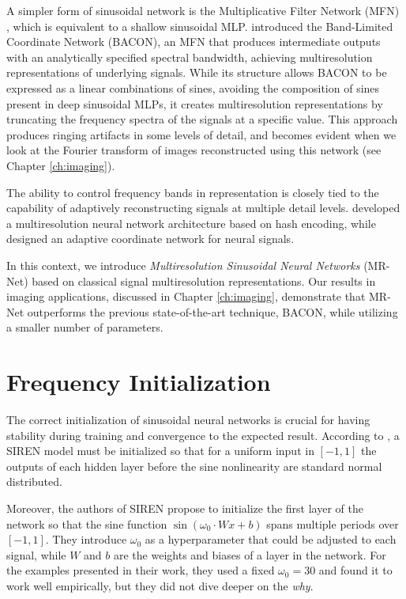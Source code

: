 A simpler form of sinusoidal network is the Multiplicative Filter Network (MFN) \cite{fathony2020multiplicative}, which is equivalent to a shallow sinusoidal MLP. \cite{bacon2021} introduced the Band-Limited Coordinate Network (BACON), an MFN that produces intermediate outputs with an analytically specified spectral bandwidth, achieving multiresolution representations of underlying signals. While its structure allows BACON to be expressed as a linear combinations of sines, avoiding the composition of sines present in deep sinusoidal MLPs, it creates multiresolution representations by truncating the frequency spectra of the signals at a specific value. This approach produces ringing artifacts in some levels of detail, and becomes evident when we look at the Fourier transform of images reconstructed using this network (see Chapter \ref{ch:imaging}).

The ability to control frequency bands in representation is closely tied to the capability of adaptively reconstructing signals at multiple detail levels. \citet{mueller2022instant} developed a multiresolution neural network architecture based on hash encoding, while \citet{martel2021acorn} designed an adaptive coordinate network for neural signals.

In this context, we introduce \textit{Multiresolution Sinusoidal Neural Networks} (MR-Net) \cite{paz2022,paz2023mr} based on classical signal multiresolution representations. Our results in imaging applications, discussed in Chapter \ref{ch:imaging}, demonstrate that MR-Net outperforms the previous state-of-the-art technique, BACON, while utilizing a smaller number of parameters.


\section{Frequency Initialization}

The correct initialization of sinusoidal neural networks is crucial for having stability during training and convergence to the expected result. According to \cite{sitzmann2019siren}, a SIREN model must be initialized so that for a uniform input in $[-1, 1]$ the outputs of each hidden layer before the sine nonlinearity are standard normal distributed. 


Moreover, the authors of SIREN propose to initialize the first layer of the network so that the sine function $\sin(\omega_0 \cdot W x + b)$ spans multiple periods over $[-1, 1]$. They introduce $\omega_0$ as a hyperparameter that could be adjusted to each signal, while $W$ and $b$ are the weights and biases of a layer in the network. For the examples presented in their work, they used a fixed $\omega_0=30$ and found it to work well empirically, but they did not dive deeper on the \emph{why}.

